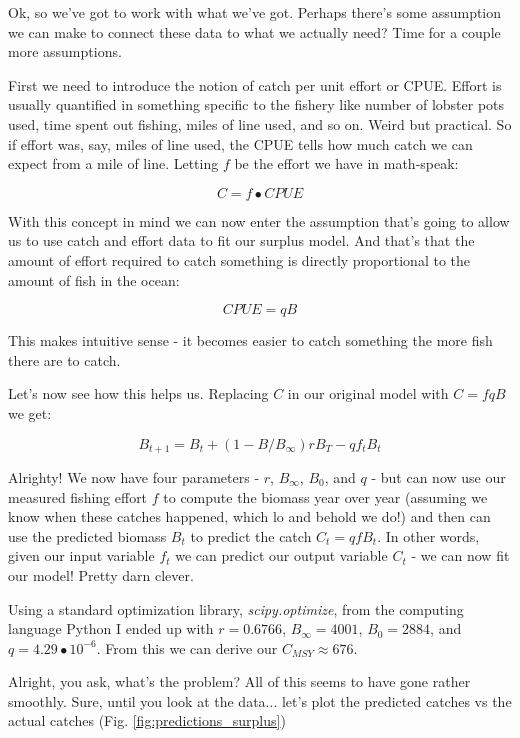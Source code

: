 \documentclass[11pt,a5paper]{book}
\begin{document}
Ok, so we've got to work with what we've got. Perhaps there's some assumption we can make to connect these data to what we actually need? Time for a couple more assumptions.
\newline

First we need to introduce the notion of catch per unit effort or CPUE. Effort is usually quantified in something specific to the fishery like number of lobster pots used, time spent out fishing, miles of line used, and so on. Weird but practical. So if effort was, say, miles of line used, the CPUE tells how much catch we can expect from a mile of line. Letting $f$ be the effort we have in math-speak:

$$C = f\bullet CPUE$$

With this concept in mind we can now enter the assumption that's going to allow us to use catch and effort data to fit our surplus model. And that's that the amount of effort required to catch something is directly proportional to the amount of fish in the ocean:

$$CPUE = qB$$

This makes intuitive sense - it becomes easier to catch something the more fish there are to catch. 
\newline

Let's now see how this helps us. Replacing $C$ in our original model with $C=fqB$ we get:

$$B_{t+1} = B_t + (1 - B/B_\infty)rB_T - qf_tB_t$$

Alrighty! We now have four parameters - $r$, $B_\infty$, $B_0$, and $q$ - but can now use our measured fishing effort $f$ to compute the biomass year over year (assuming we know when these catches happened, which lo and behold we do!) and then can use the predicted biomass $B_t$ to predict the catch $C_t = qfB_t$. In other words, given our input variable $f_t$ we can predict our output variable $C_t$ - we can now fit our model! Pretty darn clever. 
\newline

Using a standard optimization library, \textit{scipy.optimize}, from the computing language Python I ended up with $r=0.6766$, $B_\infty = 4001$, $B_0 =2884$, and $q=4.29\bullet 10^{-6}$. From this we can derive our $C_{MSY}\approx 676$.
\newline

Alright, you ask, what's the problem? All of this seems to have gone rather smoothly. Sure, until you look at the data... let's plot the predicted catches vs the actual catches (Fig. \ref{fig:predictions_surplus})
\newline
\end{document}
